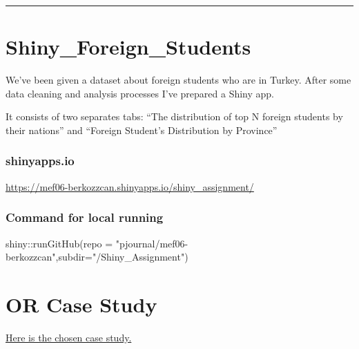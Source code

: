 \documentclass[
  letterpaper,
  DIV=11,
  numbers=noendperiod]{scrreprt}
\newenvironment{Shaded}{\begin{snugshade}}{\end{snugshade}}
\newcommand{\AttributeTok}[1]{\textcolor[rgb]{0.40,0.45,0.13}{#1}}
\newcommand{\FunctionTok}[1]{\textcolor[rgb]{0.28,0.35,0.67}{#1}}
\newcommand{\NormalTok}[1]{\textcolor[rgb]{0.00,0.23,0.31}{#1}}
\newcommand{\SpecialCharTok}[1]{\textcolor[rgb]{0.37,0.37,0.37}{#1}}
\newcommand{\StringTok}[1]{\textcolor[rgb]{0.13,0.47,0.30}{#1}}
\begin{document}
\begin{center}\rule{0.5\linewidth}{0.5pt}\end{center}


\hypertarget{shiny_foreign_students}{%
\chapter{Shiny\_Foreign\_Students}\label{shiny_foreign_students}}

We've been given a dataset about foreign students who are in Turkey.
After some data cleaning and analysis processes I've prepared a Shiny
app.

It consists of two separates tabs: ``The distribution of top N foreign
students by their nations'' and ``Foreign Student's Distribution by
Province''

\hypertarget{shinyapps.io}{%
\subsection{shinyapps.io}\label{shinyapps.io}}

\url{https://mef06-berkozzcan.shinyapps.io/shiny_assignment/}

\hypertarget{command-for-local-running}{%
\subsection{Command for local running}\label{command-for-local-running}}

\begin{Shaded}
\begin{Highlighting}[]
\NormalTok{shiny}\SpecialCharTok{::}\FunctionTok{runGitHub}\NormalTok{(}\AttributeTok{repo =} \StringTok{"pjournal/mef06{-}berkozzcan"}\NormalTok{,}\AttributeTok{subdir=}\StringTok{"/Shiny\_Assignment"}\NormalTok{)}
\end{Highlighting}
\end{Shaded}


\hypertarget{or-case-study}{%
\chapter{OR Case Study}\label{or-case-study}}

\href{https://www.gurobi.com/case_studies/toyota-production-planning-optimization/}{Here
is the chosen case study.}
\end{document}
